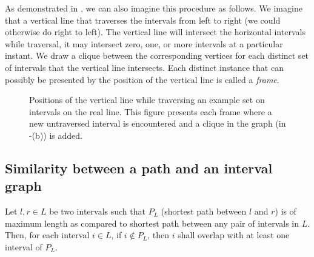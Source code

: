 As demonstrated in , we can also imagine this procedure as follows. We imagine that a vertical line that traverses the intervals from left to right (we could otherwise do right to left). The vertical line will intersect the horizontal intervals while traversal, it may intersect zero, one, or more intervals at a particular instant. We draw a clique between the corresponding vertices for each distinct set of intervals that the vertical line intersects. Each distinct instance that can possibly be presented by the position of the vertical line is called a \textit{frame}.

\begin{figure}
	\centering
	\caption{Positions of the vertical line while traversing an example set on intervals on the real line. This figure presents each frame where a new untraversed interval is encountered and a clique in the graph (in -(b)) is added.}
	\label{figure:example-interval-graph-frames}
\end{figure}

\subsection{Similarity between a path and an interval graph}\label{subsection:IG-path-similar}

\begin{proposition}\label{proposition:LongestPathLIG}
Let $l,r\in L$ be two intervals such that $P_L$ (shortest path between $l$ and $r$) is of maximum length as compared to shortest path between any pair of intervals in $L$. Then, for each interval $i\in L$, if $i\not\in P_L$, then $i$ shall overlap with at least one interval of $P_L$.
\end{proposition}

